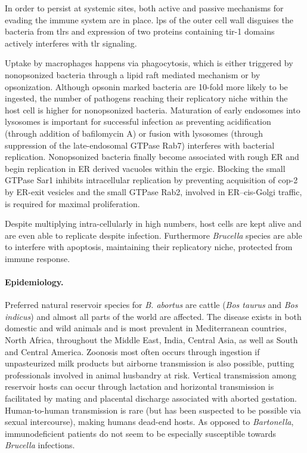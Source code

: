 In order to persist at systemic sites, both active and passive mechanisms for evading the immune system are in place. \Gls{lps} of the outer cell wall disguises the bacteria from \glspl{tlr} and expression of two proteins containing \gls{tir-1} domains actively interferes with \gls{tlr} signaling.

Uptake by macrophages happens via phagocytosis, which is either triggered by nonopsonized bacteria through a lipid raft mediated mechanism or by opsonization. Although opsonin marked bacteria are 10-fold more likely to be ingested, the number of pathogens reaching their replicatory niche within the host cell is higher for nonopsonized bacteria. Maturation of early endosomes into lysosomes is important for successful infection as preventing acidification (through addition of bafilomycin A) or fusion with lysosomes (through suppression of the late-endosomal GTPase Rab7) interferes with bacterial replication. Nonopsonized bacteria finally become associated with rough ER and begin replication in ER derived vacuoles within the \gls{ergic}. Blocking the small GTPase Sar1 inhibits intracellular replication by preventing acquisition of \gls{cop-2} by ER-exit vesicles and the small GTPase Rab2, involved in ER--cis-Golgi traffic, is required for maximal proliferation.

Despite multiplying intra-cellularly in high numbers, host cells are kept alive and are even able to replicate despite infection. Furthermore \textit{Brucella} species are able to interfere with apoptosis, maintaining their replicatory niche, protected from immune response.

\paragraph{Epidemiology.}
Preferred natural reservoir species for \textit{B. abortus} are cattle (\textit{Bos taurus} and \textit{Bos indicus}) and almost all parts of the world are affected. The disease exists in both domestic and wild animals and is most prevalent in Mediterranean countries, North Africa, throughout the Middle East, India, Central Asia, as well as South and Central America. Zoonosis most often occurs through ingestion if unpasteurized milk products but airborne transmission is also possible, putting professionals involved in animal husbandry at risk. Vertical transmission among reservoir hosts can occur through lactation and horizontal transmission is facilitated by mating and placental discharge associated with aborted gestation. Human-to-human transmission is rare (but has been suspected to be possible via sexual intercourse), making humans dead-end hosts. As opposed to \textit{Bartonella}, immunodeficient patients do not seem to be especially susceptible towards \textit{Brucella} infections.

